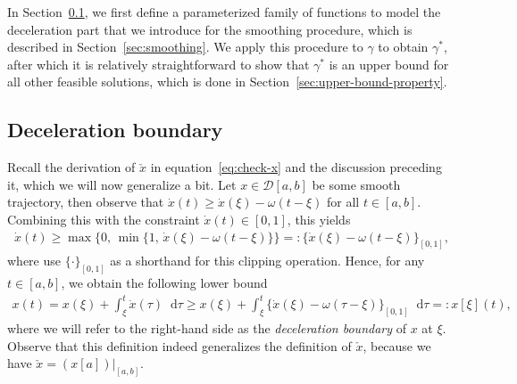 \documentclass{report}
\theoremstyle{definition}
\theoremstyle{plain}
\newcommand*\diff{\mathop{}\!\mathrm{d}}
\begin{document}
In Section~\ref{sec:deceleration-boundary}, we first define a parameterized
family of functions to model the deceleration part that we introduce for the
smoothing procedure, which is described in Section~\ref{sec:smoothing}.
%
We apply this procedure to $\gamma$ to obtain $\gamma^{*}$, after which it is
relatively straightforward to show that $\gamma^{*}$ is an upper bound for all
other feasible solutions, which is done in
Section~\ref{sec:upper-bound-property}.


\subsection{Deceleration boundary}\label{sec:deceleration-boundary}
%
Recall the derivation of $\check{x}$ in equation~\eqref{eq:check-x} and the discussion
preceding it, which we will now generalize a bit.
%
Let $x \in \mathcal{D}[a, b]$ be some smooth trajectory, then observe that $\dot{x}(t) \geq \dot{x}(\xi) - \omega(t - \xi)$ for all $t \in [a, b]$.
Combining this with the constraint $\dot{x}(t) \in [0, 1]$, this yields
\begin{align}
  \dot{x}(t) \geq \max\{ 0, \, \min\{1, \, \dot{x}(\xi) - \omega (t - \xi) \}\} =: \{\dot{x}(\xi) - \omega(t-\xi)\}_{[0,1]} ,
\end{align}
where use $\{ \cdot \}_{[0,1]}$ as a shorthand for this clipping operation.
%
Hence, for any $t \in [a,b]$, we obtain the following lower bound
\begin{align}\label{eq:deceleration-boundary}
  x(t) = x(\xi) + \int_{\xi}^{t} \dot{x}(\tau) \diff \tau \geq x(\xi) + \int_{\xi}^{t} \{\dot{x}(\xi) - \omega(\tau - \xi)\}_{[0,1]} \diff \tau =: x[\xi] (t) ,
\end{align}
where we will refer to the right-hand side as the \emph{deceleration boundary} of $x$
at $\xi$.
%
Observe that this definition indeed generalizes the definition of $\check{x}$,
because we have $\check{x}=(x[a])|_{[a,b]}$.
\end{document}
